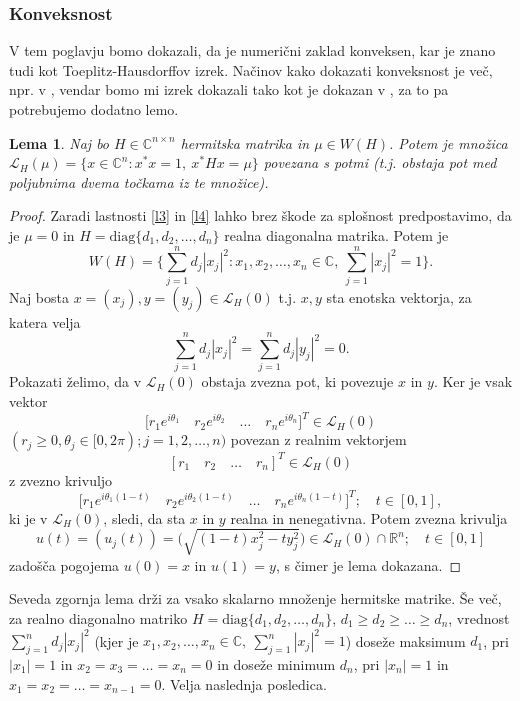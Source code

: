 \documentclass[12pt,a4paper]{amsart}
\theoremstyle{definition}
\theoremstyle{plain}
\newtheorem{lema}[definicija]{Lema}
\newcommand{\LH}{\mathcal{L}}
\newcommand{\R}{\mathbb R}
\newcommand{\C}{\mathbb C}
\begin{document}
\subsubsection{Konveksnost}
V tem poglavju bomo dokazali, da je numerični zaklad konveksen, kar je znano tudi kot Toeplitz-Hausdorffov izrek. 
Načinov kako dokazati konveksnost je več, npr. v \cite{num}, vendar bomo mi izrek dokazali tako kot je dokazan v \cite{zaloga}, za to pa potrebujemo dodatno lemo. 
\begin{lema}\cite{zaloga}
Naj bo $H\in \C^{n\times n}$ hermitska matrika in $\mu \in W(H)$. Potem je množica $\LH _{H}(\mu)=\{x\in \C^n \! : x^\ast x=1,\ x^\ast Hx=\mu\}$ povezana s potmi (t.j. obstaja pot med poljubnima dvema točkama iz te množice).%
\end{lema}

\begin{proof}
Zaradi lastnosti \ref{l3} in \ref{l4} lahko brez škode za splošnost predpostavimo, da je $\mu=0$ in $H=\text{diag}\{d_1,d_2,\dots,d_n\}$ realna diagonalna matrika.
Potem je 
$$W(H)=\Big\{ \sum_{j=1}^{n} d_j|x_j|^2: x_1,x_2,\dots,x_n \in \C,\ \sum_{j=1}^{n} |x_j|^2=1\Big \}.$$
Naj bosta $x=(x_j), y=(y_j)\in \LH_{H}(0)$ t.j. $x,y$ sta enotska vektorja, za katera velja 
$$\sum_{j=1}^{n} d_j|x_j|^2=\sum_{j=1}^{n} d_j|y_j|^2=0.$$
 Pokazati želimo, da v $\LH_{H}(0)$ obstaja zvezna pot, ki povezuje $x$ in $y$. Ker je vsak vektor 
$$\Big[r_1 e^{i\theta_1}\quad  r_2 e^{i\theta_2}\quad  \dots\quad r_n e^{i\theta_n}\Big]^T \in \LH_{H}(0)$$  
$(r_j \geq 0, \theta_j\in [0, 2\pi); j=1,2,\dots,n)$ povezan z realnim vektorjem 
$$[r_1 \quad r_2 \quad \dots \quad r_n]^T \in \LH_{H}(0)$$
 z zvezno krivuljo
$$\Big[r_1 e^{i\theta_1(1-t)}\quad  r_2 e^{i\theta_2(1-t)}\quad  \dots\quad  r_n e^{i\theta_n(1-t)}\Big]^T; \quad t\in[0,1],$$
ki je v $\LH_{H}(0)$, sledi, da sta $x$ in $y$ realna in nenegativna. Potem zvezna krivulja
$$u(t)=(u_j(t))=\Big(\sqrt{(1-t)x^2_j -ty^2_j}\Big) \in \LH_{H}(0)\cap \R^n ; \quad t\in [0,1]$$
zadošča pogojema $u (0)=x$ in $u (1) =y$, s čimer je lema dokazana.
\end{proof}

Seveda zgornja lema drži za vsako skalarno množenje hermitske matrike.
Še več, za realno diagonalno matriko $H=\text{diag}\{d_1,d_2,\dots,d_n\}$, $d_1\geq d_2\geq \dots \geq d_n$, vrednost $\sum_{j=1}^{n} d_j|x_j|^2$ 
(kjer je $x_1,x_2,\dots, x_n \in \C,\ \sum_{j=1}^{n}|x_j|^2 =1$) doseže maksimum $d_1$, pri $|x_1|=1$ in $x_2=x_3=\dots=x_n=0$ in doseže minimum $d_n$, pri $|x_n|=1$ in $x_1=x_2=\dots=x_{n-1}=0$. Velja naslednja posledica.
\end{document}
